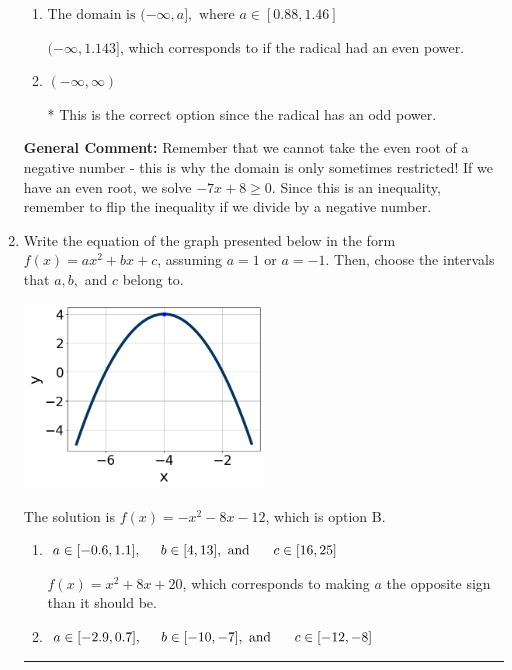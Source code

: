 \documentclass{extbook}[14pt]
\newcommand{\litem}[1]{\item #1

\rule{\textwidth}{0.4pt}}
\begin{document}
\begin{enumerate}
{\begin{enumerate}[label=\Alph*.]
$[1.143, \infty)$, which corresponds to if the radical had an even power AND reversing the direction of the domain.
\item \( \text{The domain is } (-\infty, a], \text{   where } a \in [0.88, 1.46] \)

$(-\infty, 1.143]$, which corresponds to if the radical had an even power.
\item \( (-\infty, \infty) \)

* This is the correct option since the radical has an odd power.
\end{enumerate}

\textbf{General Comment:} Remember that we cannot take the even root of a negative number - this is why the domain is only sometimes restricted! If we have an even root, we solve $-7 x + 8 \geq 0$. Since this is an inequality, remember to flip the inequality if we divide by a negative number.
}
\litem{
Write the equation of the graph presented below in the form $f(x)=ax^2+bx+c$, assuming  $a=1$ or $a=-1$. Then, choose the intervals that $a, b,$ and $c$ belong to.

\begin{center}
    \includegraphics[width=0.5\textwidth]{../Figures/quadraticGraphToEquationA.png}
\end{center}




The solution is \( f(x) = -x^{2} -8 x -12 \), which is option B.\begin{enumerate}[label=\Alph*.]
\item \( a \in [-0.6, 1.1], \hspace*{5mm} b \in [4, 13], \text{ and } \hspace*{5mm} c \in [16, 25] \)

$f(x)=x^{2} +8 x + 20$, which corresponds to making $a$ the opposite sign than it should be.
\item \( a \in [-2.9, 0.7], \hspace*{5mm} b \in [-10, -7], \text{ and } \hspace*{5mm} c \in [-12, -8] \)


\end{enumerate}}
\end{enumerate}
\end{document}
